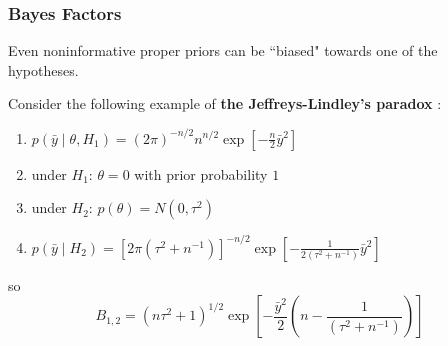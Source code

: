 \documentclass{beamer}
\begin{document}
\begin{frame}
\frametitle{Bayes Factors}

Even noninformative proper priors can be ``biased" towards one of the hypotheses. 
\newline


Consider the following example of {\bf the Jeffreys-Lindley's paradox }: 
\begin{enumerate}
\item $p(\bar{y} \mid \theta, H_1)  = (2\pi)^{-n/2}n^{n/2} \exp\left[-\frac{n}{2}\bar{y}^2 \right]$
\item under $H_1$: $\theta = 0$ with prior probability $1$
\item under $H_2$: $p(\theta) = N(0,\tau^2)$
\item $p(\bar{y} \mid H_2) = [2\pi(\tau^2 + n^{-1})]^{-n/2} \exp\left[-\frac{1}{2(\tau^2 + n^{-1})}\bar{y}^2 \right]$
\end{enumerate}
so
\[
B_{1,2} = (n\tau^2 + 1)^{1/2} \exp\left[-\frac{\bar{y}^2}{2}\left(n - \frac{1}{(\tau^2 + n^{-1})}\right) \right]
\]


\end{frame}
\end{document}
